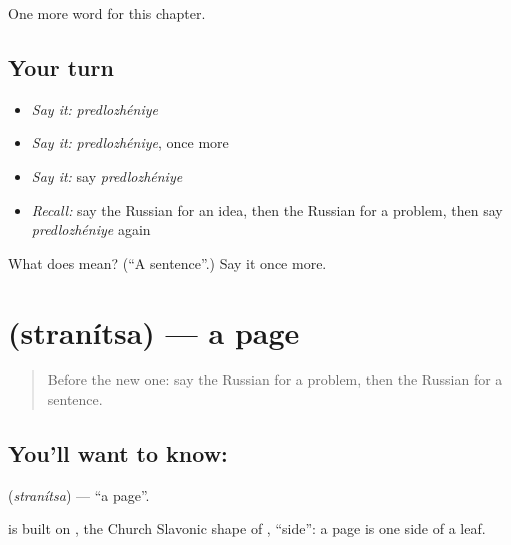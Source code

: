 \begin{grammarlens}[title={What you've built}]
One more word for this chapter.
\end{grammarlens}

\subsection*{Your turn}
\begin{itemize}
\raggedright
  \item \emph{Say it:} \emph{predlozhéniye}
  \item \emph{Say it:} \emph{predlozhéniye}, once more
  \item \emph{Say it:} say \emph{predlozhéniye}
  \item \emph{Recall:} say the Russian for an idea, then the Russian for a problem, then say \emph{predlozhéniye} again
\end{itemize}

\begin{tcolorbox}[breakable,colback=teal!4,colframe=teal!35!black,title={Before you move on}]
What does  mean? (\textquotedblleft{}A sentence\textquotedblright{}.) Say it once more.
\end{tcolorbox}
\section[\texorpdfstring{\ru{страница} (stranítsa)}{страница (stranítsa)}]{ (stranítsa) — a page}

\label{lesson:RU-C112-page}



\begin{quote}
Before the new one: say the Russian for a problem, then the Russian for a sentence.
\end{quote}

\subsection*{You'll want to know: }
\textbf{} (\emph{stranítsa}) — \textquotedblleft{}a page\textquotedblright{}.

\begin{cousinweb}
\textbf{} is built on \emph{}, the Church Slavonic shape of \emph{}, \textquotedblleft{}side\textquotedblright{}: a page is one side of a leaf.
\end{cousinweb}

